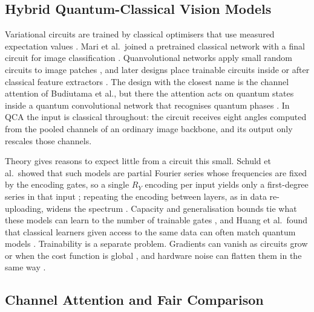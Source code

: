 \documentclass[10pt,twocolumn]{article}
\newcommand{\QCA}{QCA}
\begin{document}
\subsection{Hybrid Quantum-Classical Vision Models}

Variational circuits are trained by classical optimisers that use measured
expectation values \citep{cerezo_2021_vqa}. Mari et al.\ joined a pretrained
classical network with a final circuit for image classification
\citep{mari_2020_transfer}. Quanvolutional networks apply small random
circuits to image patches \citep{henderson_2020_quanvolutional}, and later
designs place trainable circuits inside or after classical feature
extractors \citep{liu_2021_hqcnn,hur_2022_qcnn,long_2025_hqcqcnn}. The
design with the closest name is the channel attention of Budiutama et al.,
but there the attention acts on quantum states inside a quantum
convolutional network that recognises quantum phases
\citep{budiutama_2024_channel}. In \QCA{} the input is classical throughout:
the circuit receives eight angles computed from the pooled channels of an
ordinary image backbone, and its output only rescales those channels.

Theory gives reasons to expect little from a circuit this small. Schuld et
al.\ showed that such models are partial Fourier series whose frequencies
are fixed by the encoding gates, so a single $R_Y$ encoding per input yields
only a first-degree series in that input \citep{schuld_2021_encoding};
repeating the encoding between layers, as in data re-uploading, widens the
spectrum \citep{schuld_2021_encoding,perez_2020_reupload}. Capacity and
generalisation bounds tie what these models can learn to the number of
trainable gates \citep{abbas_2021_power,caro_2022_generalization}, and
Huang et al.\ found that classical learners given access to the same data
can often match quantum models \citep{huang_2021_data}. Trainability is a
separate problem. Gradients can vanish as circuits grow or when the cost
function is global \citep{cerezo_2021_barren}, and hardware noise can
flatten them in the same way \citep{wang_2021_noise}.

\subsection{Channel Attention and Fair Comparison}
\end{document}
